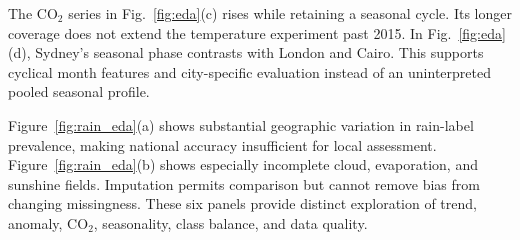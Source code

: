 \documentclass[conference]{IEEEtran}
\begin{document}
The CO$_2$ series in Fig.~\ref{fig:eda}(c) rises while retaining a seasonal cycle. Its longer coverage does not extend the temperature experiment past 2015. In Fig.~\ref{fig:eda}(d), Sydney's seasonal phase contrasts with London and Cairo. This supports cyclical month features and city-specific evaluation instead of an uninterpreted pooled seasonal profile.

Figure~\ref{fig:rain_eda}(a) shows substantial geographic variation in rain-label prevalence, making national accuracy insufficient for local assessment. Figure~\ref{fig:rain_eda}(b) shows especially incomplete cloud, evaporation, and sunshine fields. Imputation permits comparison but cannot remove bias from changing missingness. These six panels provide distinct exploration of trend, anomaly, CO$_2$, seasonality, class balance, and data quality.
\end{document}
